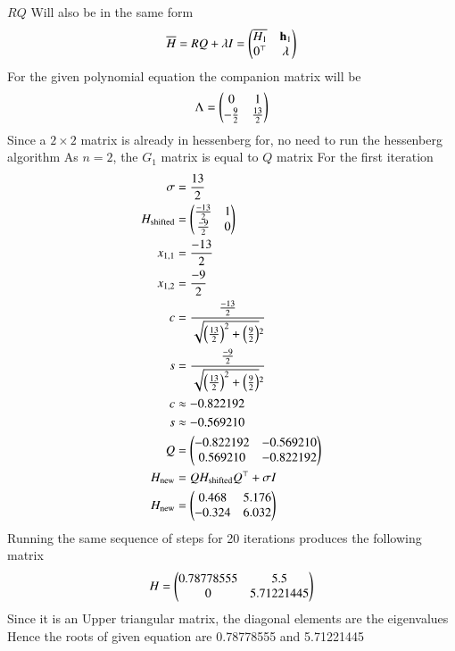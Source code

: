 \documentclass[journal]{IEEEtran}
\begin{document}
$RQ$ Will also be in the same form
\begin{align}
\overline{H} = RQ+\lambda I = \begin{pmatrix}\overline{H_1} & \mathbf{h}_1\\0^\top & \lambda\end{pmatrix}
\end{align}
\newline\newline
For the given polynomial equation the companion matrix will be
\begin{align}
	\Lambda = \begin{pmatrix}0 & 1\\-\frac{9}{2} & \frac{13}{2}\end{pmatrix}
\end{align}
Since a $2\times 2$ matrix is already in hessenberg for, no need to run the hessenberg algorithm\newline
As $n=2$, the $G_1$ matrix is equal to $Q$ matrix\newline
For the first iteration
\begin{align}
\sigma &= \frac{13}{2}\\
H_{\text{shifted}} &= \begin{pmatrix}\frac{-13}{2} & 1\\ \frac{-9}{2} & 0\end{pmatrix}\\
x_{1,1} &=  \frac{-13}{2}\\
x_{1,2} &=  \frac{-9}{2}\\
c &= \frac{\frac{-13}{2}}{\sqrt{\left(\frac{13}{2}\right)^2+\left(\frac{9}{2}\right)}^2}\\
s &= \frac{\frac{-9}{2}}{\sqrt{\left(\frac{13}{2}\right)^2+\left(\frac{9}{2}\right)}^2}\\
c &\approx -0.822192\\
s &\approx -0.569210\\
Q &= \begin{pmatrix}-0.822192 & -0.569210\\0.569210 &-0.822192\end{pmatrix}\\
H_{\text{new}} &= QH_{\text{shifted}}Q^\top+\sigma I\\
H_{\text{new}} &= \begin{pmatrix}0.468 & 5.176\\-0.324 & 6.032\end{pmatrix} 
\end{align}
Running the same sequence of steps for 20 iterations produces the following matrix
\begin{align}
H = \begin{pmatrix}0.78778555 & 5.5\\ 0 & 5.71221445\end{pmatrix}
\end{align}
Since it is an Upper triangular matrix, the diagonal elements are the eigenvalues\newline
Hence the roots of given equation are 0.78778555 and 5.71221445
\end{document}
